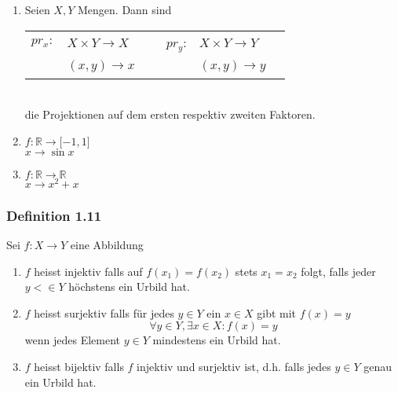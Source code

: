 \begin{enumerate}
\item Seien $X,Y$ Mengen. Dann sind \\
\begin{tabular}{r  l c r l c }
$pr_x:$ & $X\times Y\rightarrow X $& ~ & $pr_y$: & $X\times Y\rightarrow Y$ \\
~& $(x,y)\rightarrow x$ & ~& ~& $(x,y)\rightarrow y$ \\
\end{tabular}\\
die Projektionen auf dem ersten respektiv zweiten Faktoren. 
\item $f:\mathbb{R}\rightarrow\lbrack -1,1\rbrack$\\ $x\rightarrow \sin x$
\item $f:\mathbb{R}\rightarrow\mathbb{R}$\\
$x\rightarrow x^2+x$
\end{enumerate}
\subsubsection*{Definition 1.11}
Sei $f:X\rightarrow Y$ eine Abbildung
\begin{enumerate}
\item $f$ heisst injektiv falls auf $f(x_1)=f(x_2)$ stets $x_1=x_2$ folgt, falls jeder $y<\in Y$ höchstens ein Urbild hat.
\item $f$ heisst surjektiv falls für jedes $y\in Y$ ein $x\in X$ gibt mit $f(x)=y$ $$\forall y\in Y, \exists x\in X:f(x)=y$$wenn jedes Element $y\in Y$ mindestens ein Urbild hat. 
\item $f$ heisst bijektiv falls $f$ injektiv und surjektiv ist, d.h. falls jedes $y\in Y$ genau ein Urbild hat. 
\end{enumerate}


